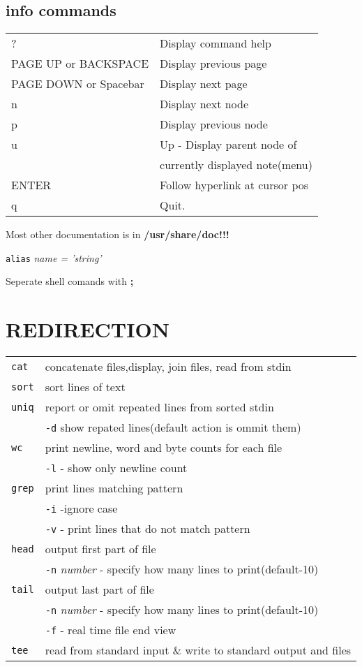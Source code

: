 \documentclass[8pt]{extarticle}
\begin{document}
\begin{multicols}{2}
\subsection{info commands}
\begin{tabular}{ll}
? &	Display command help\\
PAGE UP or BACKSPACE & Display previous page\\
PAGE DOWN or Spacebar & Display next page\\
n &	Display next node\\
p &	Display previous node\\
u &	Up - Display parent node of \\ &currently displayed note(menu)\\
ENTER &	Follow hyperlink at cursor pos\\
q &	Quit.
\end{tabular}

Most other documentation is in \textbf{/usr/share/doc!!!}

\texttt{alias} \textit{name = 'string'}

Seperate shell comands with \textbf{;}

\section{REDIRECTION}

\begin{tabular}{ll}
\texttt{cat} & concatenate files,display, join files, read from stdin\\
\texttt{sort} & sort lines of text\\
\texttt{uniq} & report or omit repeated lines from sorted stdin\\
& \texttt{-d} show repated lines(default action is ommit them)\\
\texttt{wc} & print newline, word and byte counts for each file\\
& \texttt{-l} - show only newline count\\
\texttt{grep} & print lines matching pattern\\
& \texttt{-i} -ignore case\\
& \texttt{-v} - print lines that do not match pattern\\
\texttt{head} & output first part of file\\
& \texttt{-n} \textit{number} - specify how many lines to print(default-10)\\
\texttt{tail} & output last part of file\\
& \texttt{-n} \textit{number} - specify how many lines to print(default-10)\\
& \texttt{-f} - real time file end view\\
\texttt{tee} & read from standard input \& write to standard output and files
\end{tabular}


\end{multicols}
\end{document}
